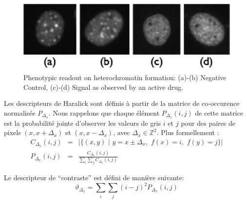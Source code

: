\documentclass[11pt,addpoints]{exam}
\begin{document}
\begin{questions}
\begin{figure}[!ht]
\centering
\includegraphics[scale=0.8]{TSA_phenotype.pdf}
\caption{Phenotypic readout on heterochromatin formation: (a)-(b)
  Negative Control, (c)-(d) Signal as observed 
  by an active drug.}
\label{fig:tsa}
\end{figure}

Les descripteurs de Haralick sont définis à partir de la matrice de
co-occurence normalisée $P_{\Delta_x}$. Nous rappelons que chaque élément
$P_{\Delta_x}(i,j)$ de cette matrice est la probabilité jointe
d'observer les valeurs de gris $i$ et $j$ pour des paires de pixels
$(x,x+\Delta_x)$ et $(x,x-\Delta_x)$, avec $\Delta_x \in
\mathbb{Z}^2$. Plus formellement :  
\begin{eqnarray*}
C_{\Delta_x}(i,j) &=& |\{(x,y) \,\,| \,\, y=x \pm \Delta_x, \,\, f(x)=i,
\,\, f(y)=j \}| \\
P_{\Delta_x}(i,j) &=& \frac{C_{\Delta_x}(i,j)}{\sum_i\sum_j C_{\Delta_x}(i,j)}
\end{eqnarray*} 


Le descripteur de ``contraste'' est défini de manière suivante: 
\begin{equation}\label{equ:haralick_contrast}
\vartheta_{\Delta_x} = \sum_i\sum_j(i-j)^2P_{\Delta_x}(i,j)
\end{equation}

\end{questions}
\end{document}
